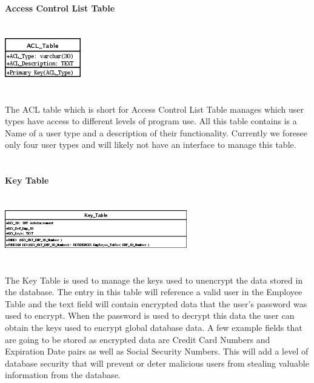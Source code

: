 \documentclass{report}
\begin{document}
    {\bf Access Control List Table}\\
    \\
    \\
    \includegraphics{Tables/ACL.png}\\
    \\
    \\
    The ACL table which is short for Access Control List Table manages which user types have access
    to different levels of program use. All this table contains is a Name of a user type and a description
    of their functionality. Currently we foresee only four user types and will likely not have an
    interface to manage this table.\\
    \\
    \\
    {\bf Key Table}\\
    \\
    \\
    \includegraphics{Tables/KeyTable.png}\\
    \\
    \\
    The Key Table is used to manage the keys used to unencrypt the data stored in the database. The
    entry in this table will reference a valid user in the Employee Table and the text field will
    contain encrypted data that the user's password was used to encrypt. When the password is used
    to decrypt this data the user can obtain the keys used to encrypt global database data. A few
    example fields that are going to be stored as encrypted data are Credit Card Numbers and Expiration
    Date pairs as well as Social Security Numbers. This will add a level of database security that
    will prevent or deter malicious users from stealing valuable information from the database.\\
    \\

    \newpage
\end{document}
